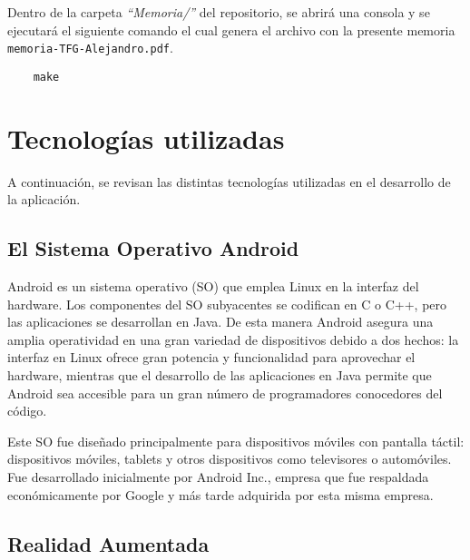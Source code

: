 Dentro de la carpeta \textit{``Memoria/''} del repositorio, se abrirá una consola y se ejecutará el siguiente comando el cual genera el archivo con la presente memoria \texttt{memoria-TFG-Alejandro.pdf}.
\begin{lstlisting}
    make
\end{lstlisting}


\section{Tecnologías utilizadas}

A continuación, se revisan las distintas tecnologías utilizadas en el desarrollo de la aplicación.

\subsection{El Sistema Operativo Android}

Android \cite{URL::Android} es un sistema operativo (SO) que emplea Linux en la interfaz del hardware.  Los componentes del SO subyacentes se codifican en C o C++, pero las aplicaciones se desarrollan en Java. De esta manera Android asegura una amplia operatividad en una gran variedad de dispositivos debido a dos hechos: la interfaz en Linux ofrece gran potencia y funcionalidad para aprovechar el hardware, mientras que el desarrollo de las aplicaciones en Java permite que Android sea accesible para un gran número de programadores conocedores del código.

Este SO fue diseñado principalmente para dispositivos móviles con pantalla táctil: dispositivos móviles, tablets y otros dispositivos como televisores o automóviles. Fue desarrollado inicialmente por Android Inc., empresa que fue respaldada económicamente por Google y más tarde adquirida por esta misma empresa.


\subsection{Realidad Aumentada}

